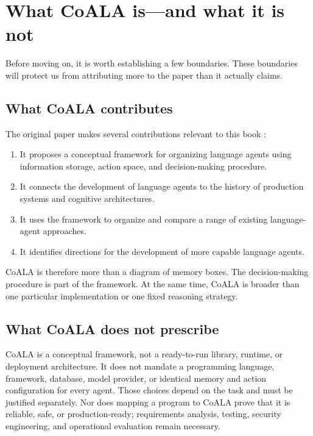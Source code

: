 \section{What CoALA is---and what it is not}\label{what-coala-isand-what-it-is-not}

Before moving on, it is worth establishing a few boundaries. These boundaries will protect us from attributing more to the paper than it actually claims.

\subsection{What CoALA contributes}\label{what-coala-contributes}

The original paper makes several contributions relevant to this book :

\begin{enumerate}
\def\labelenumi{\arabic{enumi}.}
\tightlist
\item
  It proposes a conceptual framework for organizing language agents using information storage, action space, and decision-making procedure.
\item
  It connects the development of language agents to the history of production systems and cognitive architectures.
\item
  It uses the framework to organize and compare a range of existing language-agent approaches.
\item
  It identifies directions for the development of more capable language agents.
\end{enumerate}

CoALA is therefore more than a diagram of memory boxes. The decision-making procedure is part of the framework. At the same time, CoALA is broader than one particular implementation or one fixed reasoning strategy.

\subsection{What CoALA does not prescribe}\label{what-coala-does-not-prescribe}

CoALA is a conceptual framework, not a ready-to-run library, runtime, or deployment architecture. It does not mandate a programming language, framework, database, model provider, or identical memory and action configuration for every agent. Those choices depend on the task and must be justified separately. Nor does mapping a program to CoALA prove that it is reliable, safe, or production-ready; requirements analysis, testing, security engineering, and operational evaluation remain necessary.

